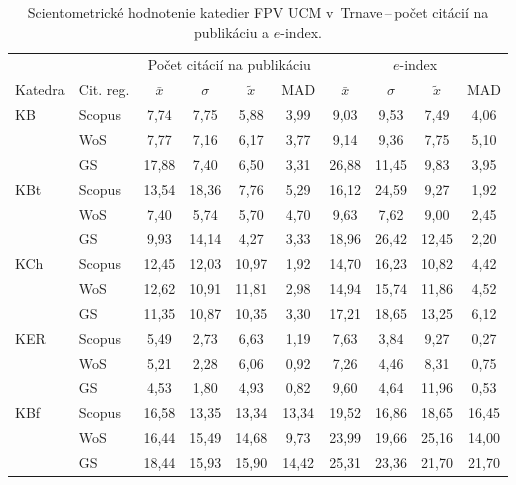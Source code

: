 \begin{table}
  \centering\small
  \caption[Hodnotenie FPV\,--\,počet citácií na publikáciu a $e$-index]%
  {Scientometrické hodnotenie katedier FPV UCM v~Trnave\,--\,počet citácií na
    publikáciu a $e$-index.}
  \label{tab:2-staff.results}
  \begin{tabularx}{\textwidth}{XXcccc@{\hspace{3ex}}cccc}
    \toprule
    & & \multicolumn{4}{c}{Počet citácií na publikáciu} & \multicolumn{4}{c}{$e$-index} \\
    \cmidrule{3-6}\cmidrule{7-10}
    Katedra  & Cit. reg. & $\bar{x}$ & $\sigma$  & $\tilde{x}$ & MAD & $\bar{x}$ & $\sigma$ & $\tilde{x}$  & MAD \\
    \midrule
    KB   & Scopus & 7,74  & 7,75  & 5,88  & 3,99  & 9,03  & 9,53  & 7,49  & 4,06  \\
         & WoS    & 7,77  & 7,16  & 6,17  & 3,77  & 9,14  & 9,36  & 7,75  & 5,10  \\
         & GS     & 17,88 & 7,40  & 6,50  & 3,31  & 26,88 & 11,45 & 9,83  & 3,95  \\[1ex]
    KBt  & Scopus & 13,54 & 18,36 & 7,76  & 5,29  & 16,12 & 24,59 & 9,27  & 1,92  \\
         & WoS    & 7,40  & 5,74  & 5,70  & 4,70  & 9,63  & 7,62  & 9,00  & 2,45  \\
         & GS     & 9,93  & 14,14 & 4,27  & 3,33  & 18,96 & 26,42 & 12,45 & 2,20  \\[1ex]
    KCh  & Scopus & 12,45 & 12,03 & 10,97 & 1,92  & 14,70 & 16,23 & 10,82 & 4,42  \\
         & WoS    & 12,62 & 10,91 & 11,81 & 2,98  & 14,94 & 15,74 & 11,86 & 4,52  \\
         & GS     & 11,35 & 10,87 & 10,35 & 3,30  & 17,21 & 18,65 & 13,25 & 6,12  \\[1ex]
    KER  & Scopus & 5,49  & 2,73  & 6,63  & 1,19  & 7,63  & 3,84  & 9,27  & 0,27  \\
         & WoS    & 5,21  & 2,28  & 6,06  & 0,92  & 7,26  & 4,46  & 8,31  & 0,75  \\
         & GS     & 4,53  & 1,80  & 4,93  & 0,82  & 9,60  & 4,64  & 11,96 & 0,53  \\[1ex]
    KBf  & Scopus & 16,58 & 13,35 & 13,34 & 13,34 & 19,52 & 16,86 & 18,65 & 16,45 \\
         & WoS    & 16,44 & 15,49 & 14,68 & 9,73  & 23,99 & 19,66 & 25,16 & 14,00 \\
         & GS     & 18,44 & 15,93 & 15,90 & 14,42 & 25,31 & 23,36 & 21,70 & 21,70 \\[1ex]

\end{tabularx}
\end{table}
